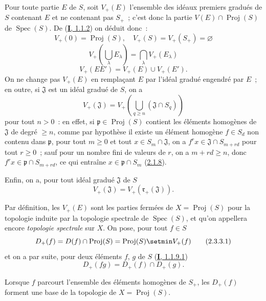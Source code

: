 \begin{env}[2.3.2]
\label{II.2.3.2-fr}
Pour toute partie $E$ de $S$, soit $V_+(E)$ l'ensemble des idéaux premiers
gradués de $S$ contenant $E$ et ne contenant pas $S_+$~; c'est donc la
partie $V(E)\cap\operatorname{Proj}(S)$ de
$\operatorname{Spec}(S)$. De (\hyperref[I.1.1.2-fr]{\textbf{I}, 1.1.2}) on déduit
donc~:
\[
  \label{II.2.3.2.1-fr}
  V_+(0)=\operatorname{Proj}(S),\quad
  V_+(S)=V_+(S_+)=\varnothing
  \tag{2.3.2.1}
\]
\[
  \label{II.2.3.2.2-fr}
  V_+\left(\bigcup_\lambda E_\lambda\right)
  =\bigcap_\lambda V_+(E_\lambda)
  \tag{2.3.2.2}
\]
\[
  \label{II.2.3.2.3-fr}
  V_+(EE')=V_+(E)\cup V_+(E').
  \tag{2.3.2.3}
\]
On ne change pas $V_+(E)$ en remplaçant $E$ par l'idéal gradué engendré par
$E$~; en outre, si $\mathfrak{J}$ est un idéal gradué de $S$, on a
\[
  \label{II.2.3.2.4-fr}
  V_+(\mathfrak{J})
  =V_+\left(\bigcup_{q\geq n}(\mathfrak{J}\cap S_q)\right)
  \tag{2.3.2.4}
\]
pour tout $n>0$~: en effet, si
$\mathfrak{p}\in\operatorname{Proj}(S)$ contient les éléments homogènes de
$\mathfrak{J}$ de degré $\geq n$, comme par hypothèse il existe un élément
homogène $f\in S_d$ non contenu dans $\mathfrak{p}$, pour tout $m\geq 0$ et
tout $x\in S_m\cap\mathfrak{J}$, on a
$f^r x\in\mathfrak{J}\cap S_{m+rd}$ pour tout $r\geq0$~; sauf pour un
nombre fini de valeurs de $r$, on a $m+rd\geq n$, donc
$f^r x\in\mathfrak{p}\cap S_{m+rd}$, ce qui entraîne
$x\in\mathfrak{p}\cap S_m$
(\hyperref[II.2.1.8-fr]{2.1.8}).

Enfin, on a, pour tout idéal gradué $\mathfrak{J}$ de $S$
\[
  \label{II.2.3.2.5-fr}
  V_+(\mathfrak{J})=V_+(\mathfrak{r}_+(\mathfrak{J})).
  \tag{2.3.2.5}
\]
\end{env}

\begin{env}[2.3.3]
\label{II.2.3.3-fr}
Par définition, les $V_+(E)$ sont les parties fermées de
$X=\operatorname{Proj}(S)$ pour la topologie induite par la topologie
spectrale de $\operatorname{Spec}(S)$, et qu'on appellera encore
\emph{topologie spectrale} sur $X$. On pose, pour tout $f\in S$
\[
  \label{II.2.3.3.1-fr}
  D_+(f)=D(f)\cap\operatorname{Proj}(S)
  =\operatorname{Proj}(S)\setmin V_+(f)
  \tag{2.3.3.1}
\]
et on a par suite, pour deux éléments $f$, $g$ de $S$
(\hyperref[I.1.1.9.1-fr]{\textbf{I}, 1.1.9.1})
\[
  \label{II.2.3.3.2-fr}
  D_+(fg)=D_+(f)\cap D_+(g).
  \tag{2.3.3.2}
\]
\end{env}

\begin{proposition}[2.3.4]
\label{II.2.3.4-fr}
Lorsque $f$ parcourt l'ensemble des éléments homogènes de $S_+$, les
$D_+(f)$ forment une base de la topologie de
$X=\operatorname{Proj}(S)$.
\end{proposition}

